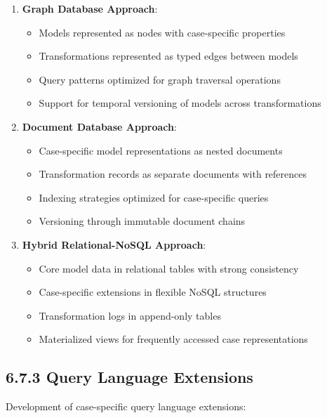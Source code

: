 \documentclass[
  11pt,
  letterpaper,
]{article}
\providecommand{\tightlist}{%
  \setlength{\itemsep}{0pt}\setlength{\parskip}{0pt}}
\begin{document}
\begin{enumerate}
\def\labelenumi{\arabic{enumi}.}
\tightlist
\item
  \textbf{Graph Database Approach}:

  \begin{itemize}
  \tightlist
  \item
    Models represented as nodes with case-specific properties
  \item
    Transformations represented as typed edges between models
  \item
    Query patterns optimized for graph traversal operations
  \item
    Support for temporal versioning of models across transformations
  \end{itemize}
\item
  \textbf{Document Database Approach}:

  \begin{itemize}
  \tightlist
  \item
    Case-specific model representations as nested documents
  \item
    Transformation records as separate documents with references
  \item
    Indexing strategies optimized for case-specific queries
  \item
    Versioning through immutable document chains
  \end{itemize}
\item
  \textbf{Hybrid Relational-NoSQL Approach}:

  \begin{itemize}
  \tightlist
  \item
    Core model data in relational tables with strong consistency
  \item
    Case-specific extensions in flexible NoSQL structures
  \item
    Transformation logs in append-only tables
  \item
    Materialized views for frequently accessed case representations
  \end{itemize}
\end{enumerate}

\hypertarget{query-language-extensions}{%
\subsection{6.7.3 Query Language
Extensions}\label{query-language-extensions}}

Development of case-specific query language extensions:
\end{document}
